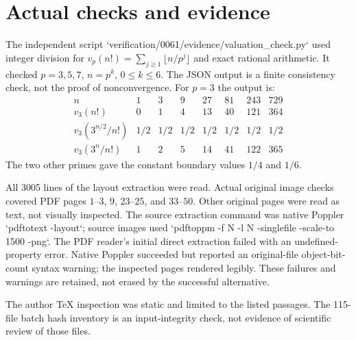 \documentclass[10pt]{article}
\begin{document}
\section*{Actual checks and evidence}
The independent script `verification/0061/evidence/valuation\_check.py` used integer division for \(v_p(n!)=\sum_{j\geq1}\lfloor n/p^j\rfloor\) and exact rational arithmetic. It checked \(p=3,5,7\), \(n=p^k\), \(0\leq k\leq6\). The JSON output is a finite consistency check, not the proof of nonconvergence. For \(p=3\) the output is: \[\begin{array}{c|rrrrrrr}
 n&1&3&9&27&81&243&729\\ \hline
 v_3(n!)&0&1&4&13&40&121&364\\
 v_3(3^{n/2}/n!)&1/2&1/2&1/2&1/2&1/2&1/2&1/2\\
 v_3(3^{n}/n!)&1&2&5&14&41&122&365
\end{array}\] The two other primes gave the constant boundary values \(1/4\) and \(1/6\).\par
All 3005 lines of the layout extraction were read. Actual original image checks covered PDF pages \(1\)–\(3\), \(9\), \(23\)–\(25\), and \(33\)–\(50\). Other original pages were read as text, not visually inspected. The source extraction command was native Poppler `pdftotext -layout`; source images used `pdftoppm -f N -l N -singlefile -scale-to 1500 -png`. The PDF reader’s initial direct extraction failed with an undefined-property error. Native Poppler succeeded but reported an original-file object-bit-count syntax warning; the inspected pages rendered legibly. These failures and warnings are retained, not erased by the successful alternative.\par
The author TeX inspection was static and limited to the listed passages. The 115-file batch hash inventory is an input-integrity check, not evidence of scientific review of those files.\par
\end{document}
